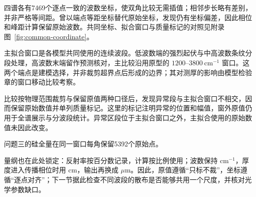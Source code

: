 四谱各有7469个逐点一致的波数坐标，使双角比较无需插值；相邻步长略有差别，并非严格等间距。曾以端点等距坐标替代原始坐标，发现仍有坐标偏差，因此相位和峰距计算保留原始波数。共同坐标、拟合窗口与质量标记的对照见附录图~\ref{fig:common-coordinate}。



主拟合窗口是各模型共同使用的连续波段。低波数端的强烈起伏与中高波数条纹分段处理，高波数末端留作预测核对，主比较沿用原型的 $1200$--$3800\ \mathrm{cm}^{-1}$ 窗口。这两个端点是建模选择，并非裁剪超界点后形成的边界；其对测厚的影响由模型检验章的窗口移动比较考察。

比较按物理范围裁剪与保留原值两种口径后，发现异常段与主拟合窗口不相交，因而保留原始数值并单列质量标记。这里的标记注明异常的位置和幅值，窗外原值仍用于全谱展示与分波段统计。异常区段位于主拟合窗口之外，主拟合使用的原始数值未因此改变。

问题三的硅全量在同一窗口每角保留5392个原始点。

量纲也在此处锁定：反射率按百分数记录，计算按比例使用；波数保持 $\mathrm{cm}^{-1}$，厚度进入传播相位时用 $\mathrm{cm}$，输出再换成 $\mu\mathrm{m}$。因此，原值遵循“只标不裁”，坐标遵循“逐点对齐”；下一节据此检查不同波段的散布是否能够共用一个尺度，并核对光学参数缺口。
